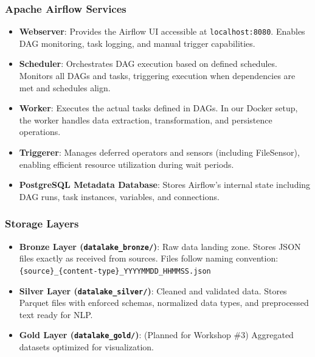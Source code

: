 \documentclass[11pt,a4paper]{article}
\begin{document}
\subsubsection{Apache Airflow Services}
\begin{itemize}
    \item \textbf{Webserver}: Provides the Airflow UI accessible at \texttt{localhost:8080}. Enables DAG monitoring, task logging, and manual trigger capabilities.
    
    \item \textbf{Scheduler}: Orchestrates DAG execution based on defined schedules. Monitors all DAGs and tasks, triggering execution when dependencies are met and schedules align.
    
    \item \textbf{Worker}: Executes the actual tasks defined in DAGs. In our Docker setup, the worker handles data extraction, transformation, and persistence operations.
    
    \item \textbf{Triggerer}: Manages deferred operators and sensors (including FileSensor), enabling efficient resource utilization during wait periods.
    
    \item \textbf{PostgreSQL Metadata Database}: Stores Airflow's internal state including DAG runs, task instances, variables, and connections.
\end{itemize}

\subsubsection{Storage Layers}
\begin{itemize}
    \item \textbf{Bronze Layer (\texttt{datalake\_bronze/})}: Raw data landing zone. Stores JSON files exactly as received from sources. Files follow naming convention: \texttt{\{source\}\_\{content-type\}\_YYYYMMDD\_HHMMSS.json}
    
    \item \textbf{Silver Layer (\texttt{datalake\_silver/})}: Cleaned and validated data. Stores Parquet files with enforced schemas, normalized data types, and preprocessed text ready for NLP.
    
    \item \textbf{Gold Layer (\texttt{datalake\_gold/})}: (Planned for Workshop \#3) Aggregated datasets optimized for visualization.
\end{itemize}
\end{document}
